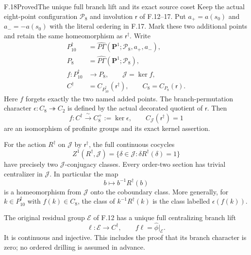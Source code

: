 \begin{claim}{F.18}{Proved}{The unique full branch lift and its exact source coset}
Keep the actual eight-point configuration $\mathcal P_8$
and involution $\mathsf r$ of F.12--17.  Put
$a_+=a(s_0)$ and $a_-=-a(s_0)$ with the literal ordering
in F.17.  Mark these two additional points and retain
the same homeomorphism as $\mathsf r^\dagger$.
Write
\[
\begin{split}
 P_{10}^{\dagger}
  &=\widehat{P\Gamma}(\mathbf P^1;\mathcal P_8,a_+,a_-),\\
 P_8&=\widehat{P\Gamma}(\mathbf P^1;\mathcal P_8),\\
 f:P_{10}^{\dagger}&\longrightarrow P_8,\qquad
 \mathcal J=\ker f,\\
 C^\dagger&=C_{P_{10}^{\dagger}}(\mathsf r^\dagger),
 \qquad C_8=C_{P_8}(\mathsf r).
\end{split}                                                     \tag{F.18.1}
\]
Here $f$ forgets exactly the two named added points.
The branch-permutation character
$\epsilon:C_8\twoheadrightarrow C_2$ is defined by
the actual decorated quotient of $\mathsf r$.
Then
\[
 f:C^\dagger\xrightarrow{\ \sim\ }C_8^+
       :=\ker\epsilon,\qquad
             C_{\mathcal J}(\mathsf r^\dagger)=1              \tag{F.18.2}
\]
are an isomorphism of profinite groups and its exact
kernel assertion.

For the action $R^\dagger$ on $\mathcal J$ by
$\mathsf r^\dagger$, the full continuous cocycles
\[
 Z^1(R^\dagger,\mathcal J)
     =\{\delta\in\mathcal J:\delta R^\dagger(\delta)=1\}
                                                               \tag{F.18.3}
\]
have precisely two $\mathcal J$-conjugacy classes.
Every order-two section has trivial centralizer in
$\mathcal J$.  In particular the map
\[
 b\longmapsto b^{-1}R^\dagger(b)
                                                               \tag{F.18.4}
\]
is a homeomorphism from $\mathcal J$ onto the
coboundary class.
More generally, for $k\in P_{10}^{\dagger}$ with
$f(k)\in C_8$, the class of
$k^{-1}R^\dagger(k)$ is the class labelled
$\epsilon(f(k))$.

The original residual group $\mathcal E$ of F.12
has a unique full centralizing branch lift
\[
 \ell:\mathcal E\longrightarrow C^\dagger,\qquad
                   f\ell=\widehat\phi|_{\mathcal E}.
                                                               \tag{F.18.5}
\]
It is continuous and injective.
This includes the proof that its branch character
is zero; no ordered drilling is assumed in advance.


\end{claim}
